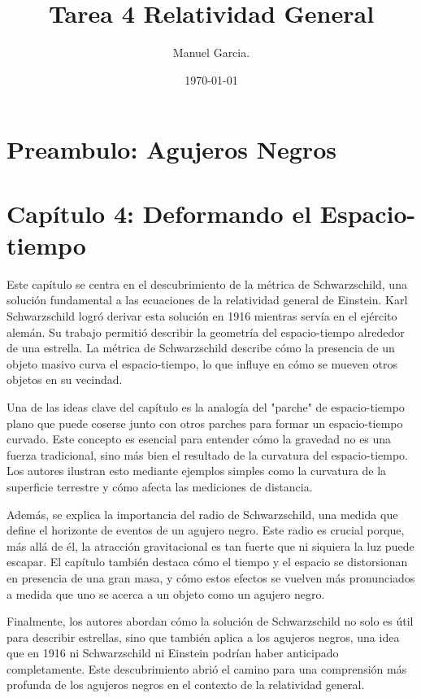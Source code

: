 \documentclass{article}
\title{Tarea 4 Relatividad General }
\author{Manuel Garcia.}
\date{\today}
\begin{document}
\maketitle

\section{Preambulo: Agujeros Negros}


\section*{Capítulo 4: Deformando el Espacio-tiempo}

Este capítulo se centra en el descubrimiento de la métrica de Schwarzschild, una solución fundamental a las ecuaciones de la relatividad general de Einstein. Karl Schwarzschild logró derivar esta solución en 1916 mientras servía en el ejército alemán. Su trabajo permitió describir la geometría del espacio-tiempo alrededor de una estrella. La métrica de Schwarzschild describe cómo la presencia de un objeto masivo curva el espacio-tiempo, lo que influye en cómo se mueven otros objetos en su vecindad.

Una de las ideas clave del capítulo es la analogía del "parche" de espacio-tiempo plano que puede coserse junto con otros parches para formar un espacio-tiempo curvado. Este concepto es esencial para entender cómo la gravedad no es una fuerza tradicional, sino más bien el resultado de la curvatura del espacio-tiempo. Los autores ilustran esto mediante ejemplos simples como la curvatura de la superficie terrestre y cómo afecta las mediciones de distancia.

Además, se explica la importancia del radio de Schwarzschild, una medida que define el horizonte de eventos de un agujero negro. Este radio es crucial porque, más allá de él, la atracción gravitacional es tan fuerte que ni siquiera la luz puede escapar. El capítulo también destaca cómo el tiempo y el espacio se distorsionan en presencia de una gran masa, y cómo estos efectos se vuelven más pronunciados a medida que uno se acerca a un objeto como un agujero negro.

Finalmente, los autores abordan cómo la solución de Schwarzschild no solo es útil para describir estrellas, sino que también aplica a los agujeros negros, una idea que en 1916 ni Schwarzschild ni Einstein podrían haber anticipado completamente. Este descubrimiento abrió el camino para una comprensión más profunda de los agujeros negros en el contexto de la relatividad general.
\end{document}
